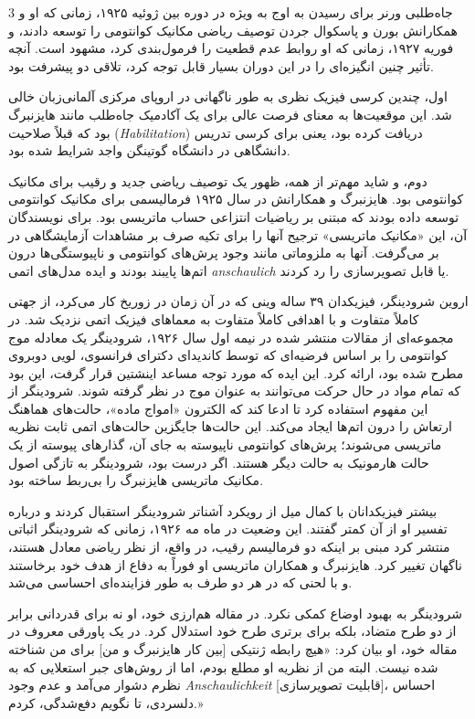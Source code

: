 \documentclass[11pt,a4paper]{article}
\begin{document}
\begin{multicols}{3}
جاه‌طلبی ورنر برای رسیدن به اوج به ویژه در دوره بین ژوئیه ۱۹۲۵، زمانی که او و همکارانش بورن و پاسکوال جردن توصیف ریاضی مکانیک کوانتومی را توسعه دادند، و فوریه ۱۹۲۷، زمانی که او روابط عدم قطعیت را فرمول‌بندی کرد، مشهود است. آنچه تأثیر چنین انگیزه‌ای را در این دوران بسیار قابل توجه کرد، تلاقی دو پیشرفت بود.

اول، چندین کرسی فیزیک نظری به طور ناگهانی در اروپای مرکزی آلمانی‌زبان خالی شد. این موقعیت‌ها به معنای فرصت عالی برای یک آکادمیک جاه‌طلب مانند هایزنبرگ بود که قبلاً صلاحیت (\textit{Habilitation}) دریافت کرده بود، یعنی برای کرسی تدریس دانشگاهی در دانشگاه گوتینگن واجد شرایط شده بود.

دوم، و شاید مهم‌تر از همه، ظهور یک توصیف ریاضی جدید و رقیب برای مکانیک کوانتومی بود. هایزنبرگ و همکارانش در سال ۱۹۲۵ فرمالیسمی برای مکانیک کوانتومی توسعه داده بودند که مبتنی بر ریاضیات انتزاعی حساب ماتریسی بود. برای نویسندگان آن، این «مکانیک ماتریسی» ترجیح آنها را برای تکیه صرف بر مشاهدات آزمایشگاهی در بر می‌گرفت. آنها به ملزوماتی مانند وجود پرش‌های کوانتومی و ناپیوستگی‌ها درون اتم‌ها پایبند بودند و ایده مدل‌های اتمی \textit{anschaulich} یا قابل تصویرسازی را رد کردند.

اروین شرودینگر، فیزیکدان ۳۹ ساله وینی که در آن زمان در زوریخ کار می‌کرد، از جهتی کاملاً متفاوت و با اهدافی کاملاً متفاوت به معماهای فیزیک اتمی نزدیک شد. در مجموعه‌ای از مقالات منتشر شده در نیمه اول سال ۱۹۲۶، شرودینگر یک معادله موج کوانتومی را بر اساس فرضیه‌ای که توسط کاندیدای دکترای فرانسوی، لویی دوبروی مطرح شده بود، ارائه کرد. این ایده که مورد توجه مساعد اینشتین قرار گرفت، این بود که تمام مواد در حال حرکت می‌توانند به عنوان موج در نظر گرفته شوند. شرودینگر از این مفهوم استفاده کرد تا ادعا کند که الکترون «امواج ماده»، حالت‌های هماهنگ ارتعاش را درون اتم‌ها ایجاد می‌کند. این حالت‌ها جایگزین حالت‌های اتمی ثابت نظریه ماتریسی می‌شوند؛ پرش‌های کوانتومی ناپیوسته به جای آن، گذارهای پیوسته از یک حالت هارمونیک به حالت دیگر هستند. اگر درست بود، شرودینگر به تازگی اصول مکانیک ماتریسی هایزنبرگ را بی‌ربط ساخته بود.

بیشتر فیزیکدانان با کمال میل از رویکرد آشناتر شرودینگر استقبال کردند و درباره تفسیر او از آن کمتر گفتند. این وضعیت در ماه مه ۱۹۲۶، زمانی که شرودینگر اثباتی منتشر کرد مبنی بر اینکه دو فرمالیسم رقیب، در واقع، از نظر ریاضی معادل هستند، ناگهان تغییر کرد. هایزنبرگ و همکاران ماتریسی او فوراً به دفاع از هدف خود برخاستند و با لحنی که در هر دو طرف به طور فزاینده‌ای احساسی می‌شد.

شرودینگر به بهبود اوضاع کمکی نکرد. در مقاله هم‌ارزی خود، او نه برای قدردانی برابر از دو طرح متضاد، بلکه برای برتری طرح خود استدلال کرد. در یک پاورقی معروف در مقاله خود، او بیان کرد: «هیچ رابطه ژنتیکی [بین کار هایزنبرگ و من] برای من شناخته شده نیست. البته من از نظریه او مطلع بودم، اما از روش‌های جبر استعلایی که به نظرم دشوار می‌آمد و عدم وجود \textit{Anschaulichkeit} [قابلیت تصویرسازی]، احساس دلسردی، تا نگویم دفع‌شدگی، کردم.»


\end{multicols}
\end{document}
